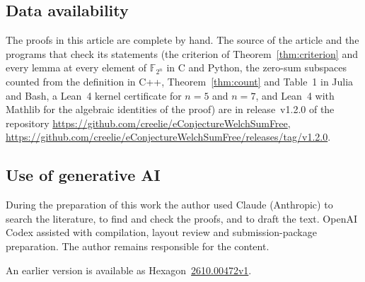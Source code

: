 \documentclass[11pt]{amsart}
\theoremstyle{definition}
\theoremstyle{remark}
\numberwithin{equation}{section}
\newcommand{\F}{\mathbb{F}}
\begin{document}
\subsection*{Data availability} The proofs in this article are complete by hand. The source of the article and the programs that check its statements (the criterion of Theorem~\ref{thm:criterion} and every lemma at every element of $\F_{2^n}$ in C and Python, the zero-sum subspaces counted from the definition in C++, Theorem~\ref{thm:count} and Table~1 in Julia and Bash, a Lean~4 kernel certificate for $n=5$ and $n=7$, and Lean~4 with Mathlib for the algebraic identities of the proof) are in release~v1.2.0 of the repository \url{https://github.com/creelie/eConjectureWelchSumFree}, \url{https://github.com/creelie/eConjectureWelchSumFree/releases/tag/v1.2.0}.

\subsection*{Use of generative AI} During the preparation of this work the author used Claude (Anthropic) to search the literature, to find and check the proofs, and to draft the text. OpenAI Codex assisted with compilation, layout review and submission-package preparation. The author remains responsible for the content.

\par\noindent An earlier version is available as Hexagon~\href{https://hexagonmath.org/2610.00472v1}{2610.00472v1}.
\end{document}
